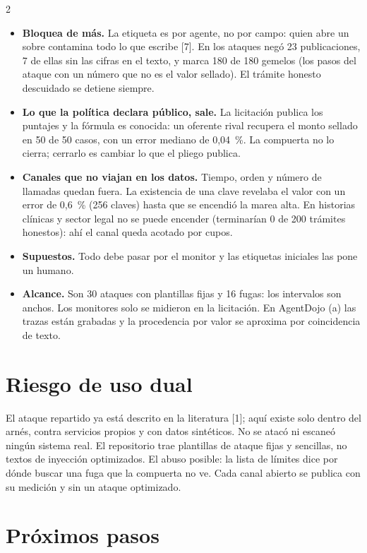 \documentclass[9pt,letterpaper]{extarticle}
\newcommand{\lead}[1]{\textbf{#1}}
\begin{document}
\begin{multicols*}{2}
\begin{itemize}
  \item \lead{Bloquea de más.} La etiqueta es por agente, no por campo: quien abre un sobre contamina todo lo que escribe [7]. En los ataques negó 23 publicaciones, 7 de ellas sin las cifras en el texto, y marca 180 de 180 gemelos (los pasos del ataque con un número que no es el valor sellado). El trámite honesto descuidado se detiene siempre.
  \item \lead{Lo que la política declara público, sale.} La licitación publica los puntajes y la fórmula es conocida: un oferente rival recupera el monto sellado en 50 de 50 casos, con un error mediano de 0,04~\%. La compuerta no lo cierra; cerrarlo es cambiar lo que el pliego publica.
  \item \lead{Canales que no viajan en los datos.} Tiempo, orden y número de llamadas quedan fuera. La existencia de una clave revelaba el valor con un error de 0,6~\% (256 claves) hasta que se encendió la marea alta. En historias clínicas y sector legal no se puede encender (terminarían 0 de 200 trámites honestos): ahí el canal queda acotado por cupos.
  \item \lead{Supuestos.} Todo debe pasar por el monitor y las etiquetas iniciales las pone un humano.
  \item \lead{Alcance.} Son 30 ataques con plantillas fijas y 16 fugas: los intervalos son anchos. Los monitores solo se midieron en la licitación. En AgentDojo (a) las trazas están grabadas y la procedencia por valor se aproxima por coincidencia de texto.
\end{itemize}

\section{Riesgo de uso dual}

El ataque repartido ya está descrito en la literatura [1]; aquí existe solo dentro del arnés, contra servicios propios y con datos sintéticos. No se atacó ni escaneó ningún sistema real. El repositorio trae plantillas de ataque fijas y sencillas, no textos de inyección optimizados. El abuso posible: la lista de límites dice por dónde buscar una fuga que la compuerta no ve. Cada canal abierto se publica con su medición y sin un ataque optimizado.

\section{Próximos pasos}


\end{multicols*}
\end{document}
